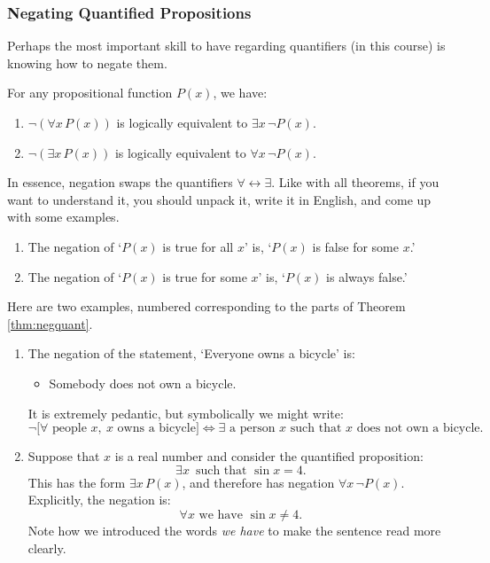 \subsubsection*{Negating Quantified Propositions}

Perhaps the most important skill to have regarding quantifiers (in this course) is knowing how to negate them.

\begin{thm}\label{thm:negquant}
For any propositional function $P(x)$, we have:
\begin{enumerate}
  \item $\neg(\forall x \, P(x))$ is logically equivalent to $\exists x\, \neg P(x)$.
  \item $\neg(\exists x \, P(x))$ is logically equivalent to $\forall x \, \neg P(x)$.
\end{enumerate}
\end{thm}
In essence, negation swaps the quantifiers $\forall\leftrightarrow\exists$. Like with all theorems, if you want to understand it, you should unpack it, write it in English, and come up with some examples.
\begin{enumerate}
  \item The negation of `$P(x)$ is true for all $x$' is, `$P(x)$ is false for some $x$.'
  \item The negation of `$P(x)$ is true for some $x$' is, `$P(x)$ is always false.'
\end{enumerate}



\begin{exs}
Here are two examples, numbered corresponding to the parts of Theorem \ref{thm:negquant}.
\begin{enumerate}
	\item The negation of the statement, `Everyone owns a bicycle' is:
	\begin{itemize}
  	\item[] Somebody does not own a bicycle.
	\end{itemize}
	It is extremely pedantic, but symbolically we might write:
	\[\neg\Big[\forall\text{ people }x,\ x\text{ owns a bicycle}\Big]\iff \exists\text{ a person $x$ such that $x$ does not own a bicycle}.\]
	\item Suppose that $x$ is a real number and consider the quantified proposition:
	\[\exists x\,\text{ such that }\sin x=4.\]
	This has the form $\exists x \,P(x)$, and therefore has negation $\forall x \, \neg P(x)$. Explicitly, the negation is:
	\[\forall x \text{ we have }\sin x\neq 4.\]
	Note how we introduced the words \emph{we have} to make the sentence read more clearly.
\end{enumerate}
\end{exs}

